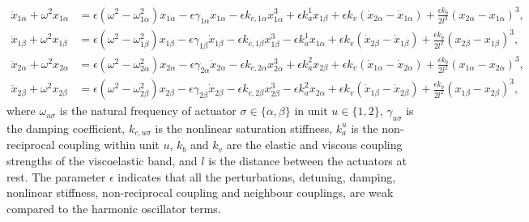 \documentclass[11pt, a4paper]{article} %
\begin{document}
\begin{appendices}
\begin{equation}
\begin{aligned}
\ddot{x}_{1\alpha} + \omega^2 x_{1\alpha} &= 
\epsilon(\omega^2 - \omega_{1\alpha}^2) x_{1\alpha}
-\epsilon \gamma_{1\alpha} \dot{x}_{1\alpha}
- \epsilon k_{c,1\alpha} x_{1\alpha}^3
+ \epsilon k_a^{1} x_{1\beta} 
+ \epsilon k_v (\dot{x}_{2\alpha} - \dot{x}_{1\alpha})
+ \frac{\epsilon k_b}{2 l^2} (x_{2\alpha} - x_{1\alpha})^3, \\
\ddot{x}_{1\beta} + \omega^2 x_{1\beta} &= 
\epsilon(\omega^2 - \omega_{1\beta}^2) x_{1\beta}
-\epsilon \gamma_{1\beta} \dot{x}_{1\beta}
- \epsilon k_{c,1\beta} x_{1\beta}^3
- \epsilon k_a^{1} x_{1\alpha}
+ \epsilon k_v (\dot{x}_{2\beta} - \dot{x}_{1\beta})
+ \frac{\epsilon k_b}{2 l^2} (x_{2\beta} - x_{1\beta})^3, \\
\ddot{x}_{2\alpha} + \omega^2 x_{2\alpha} &= 
\epsilon(\omega^2 - \omega_{2\alpha}^2) x_{2\alpha}
-\epsilon \gamma_{2\alpha} \dot{x}_{2\alpha}
- \epsilon k_{c,2\alpha} x_{2\alpha}^3
+ \epsilon k_a^{2} x_{2\beta} 
+ \epsilon k_v (\dot{x}_{1\alpha} - \dot{x}_{2\alpha})
+ \frac{\epsilon k_b}{2 l^2} (x_{1\alpha} - x_{2\alpha})^3, \\
\ddot{x}_{2\beta} + \omega^2 x_{2\beta} &= 
\epsilon(\omega^2 - \omega_{2\beta}^2) x_{2\beta}
-\epsilon \gamma_{2\beta} \dot{x}_{2\beta}
- \epsilon k_{c,2\beta} x_{2\beta}^3
- \epsilon k_a^{2} x_{2\alpha}
+ \epsilon k_v (\dot{x}_{1\beta} - \dot{x}_{2\beta})
+ \frac{\epsilon k_b}{2 l^2} (x_{1\beta} - x_{2\beta})^3,
\end{aligned}
\end{equation}
where $\omega_{u\sigma}$ is the natural frequency of actuator $\sigma\in\{\alpha,\beta\}$ in unit $u\in\{1,2\}$, 
$\gamma_{u\sigma}$ is the damping coefficient, $k_{c,u\sigma}$ is the nonlinear saturation stiffness,
$k_a^{u}$ is the non-reciprocal coupling within unit $u$, $k_b$ and $k_v$ 
are the elastic and viscous coupling strengths of the viscoelastic band, and $l$ 
is the distance between the actuators at rest. The parameter $\epsilon$ indicates that all the perturbations, 
detuning, damping, nonlinear stiffness, non-reciprocal coupling and neighbour couplings, are weak compared to the harmonic oscillator terms.


\end{appendices}
\end{document}

